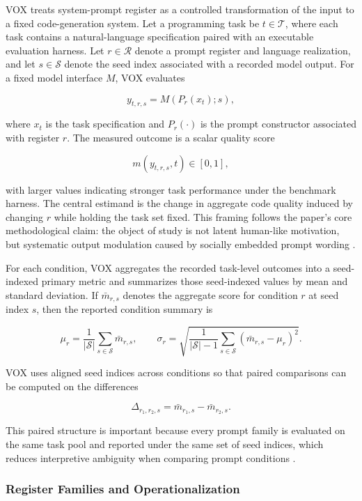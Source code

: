 \documentclass{article}
\begin{document}
VOX treats system-prompt register as a controlled transformation of the input to a fixed code-generation system. Let a programming task be \( t \in \mathcal{T} \), where each task contains a natural-language specification paired with an executable evaluation harness. Let \( r \in \mathcal{R} \) denote a prompt register and language realization, and let \( s \in \mathcal{S} \) denote the seed index associated with a recorded model output. For a fixed model interface \( M \), VOX evaluates

\[
y_{t,r,s} = M(P_r(x_t); s),
\]

where \( x_t \) is the task specification and \( P_r(\cdot) \) is the prompt constructor associated with register \( r \). The measured outcome is a scalar quality score

\[
m(y_{t,r,s}, t)\in[0,1],
\]

with larger values indicating stronger task performance under the benchmark harness. The central estimand is the change in aggregate code quality induced by changing \( r \) while holding the task set fixed. This framing follows the paper's core methodological claim: the object of study is not latent human-like motivation, but systematic output modulation caused by socially embedded prompt wording \cite{kitayama2022varieties, conneau2020emerging}.

For each condition, VOX aggregates the recorded task-level outcomes into a seed-indexed primary metric and summarizes those seed-indexed values by mean and standard deviation. If \( \bar{m}_{r,s} \) denotes the aggregate score for condition \( r \) at seed index \( s \), then the reported condition summary is

\[
\mu_r = \frac{1}{|\mathcal{S}|}\sum_{s \in \mathcal{S}} \bar{m}_{r,s},
\qquad
\sigma_r = \sqrt{\frac{1}{|\mathcal{S}|-1}\sum_{s \in \mathcal{S}}(\bar{m}_{r,s}-\mu_r)^2 }.
\]

VOX uses aligned seed indices across conditions so that paired comparisons can be computed on the differences

\[
\Delta_{r_1,r_2,s}=\bar{m}_{r_1,s}-\bar{m}_{r_2,s}.
\]

This paired structure is important because every prompt family is evaluated on the same task pool and reported under the same set of seed indices, which reduces interpretive ambiguity when comparing prompt conditions \cite{titone2022rethinking, zhang2023multilingual}.

\subsubsection{Register Families and Operationalization}
\end{document}
